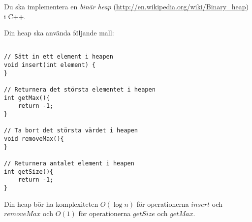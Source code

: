 
Du ska implementera en \emph{binär heap} (\url{http://en.wikipedia.org/wiki/Binary_heap}) i C++.

Din heap ska använda följande mall:

\begin{verbatim}

// Sätt in ett element i heapen
void insert(int element) {
}

// Returnera det största elementet i heapen
int getMax(){
	return -1;
}

// Ta bort det största värdet i heapen
void removeMax(){
}

// Returnera antalet element i heapen
int getSize(){
	return -1;
}

\end{verbatim}

Din heap bör ha komplexiteten $O(\log n)$ för operationerna $insert$ och $removeMax$ och $O(1)$ för operationerna $getSize$ och $getMax$.
